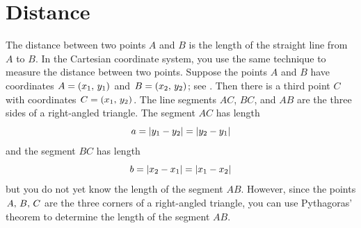 \documentclass[a4paper,oneside,12pt]{article}
\begin{document}



\section{Distance}

The distance between two points $A$ and $B$ is the length of the
straight line from $A$ to $B$.  In the Cartesian coordinate system,
you use the same technique to measure the distance between two
points.  Suppose the points $A$ and $B$ have coordinates
$A = \left\lparen{x_1},\, {y_1}\right\rparen$ and $B = \left\lparen{x_2},\, {y_2}\right\rparen$; see
.  Then there is a third point
$C$ with coordinates $C = \left\lparen{x_1},\, {y_2}\right\rparen$.  The line segments $AC$,
$BC$, and $AB$ are the three sides of a right-angled triangle.  The
segment $AC$ has length
\[
a
=
\lvert y_1 - y_2\rvert
=
\lvert y_2 - y_1\rvert
\]
and the segment $BC$ has length
\[
b
=
\lvert x_2 - x_1\rvert
=
\lvert x_1 - x_2\rvert
\]
but you do not yet know the length of the segment $AB$.  However,
since the points ${A},\, {B},\, {C}$ are the three corners of a
right-angled triangle, you can use Pythagoras' theorem to determine
the length of the segment $AB$.
\end{document}
